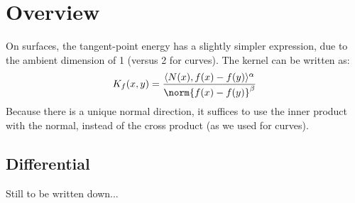 \documentclass[11pt]{article}
\DeclarePairedDelimiter{\inner}{\langle}{\rangle}
\begin{document}

\thispagestyle{empty}

\section{Overview}

On surfaces, the tangent-point energy has a slightly simpler expression, due to the ambient dimension of 1 (versus 2 for curves). The kernel can be written as:
\begin{equation}
K_f(x, y) = \frac{\inner{N(x), f(x) - f(y)}^{\alpha}}{\norm{f(x) - f(y)}^{\beta}}
\end{equation}
Because there is a unique normal direction, it suffices to use the inner product with the normal, instead of the cross product (as we used for curves).

\subsection{Differential}

Still to be written down...
\end{document}
